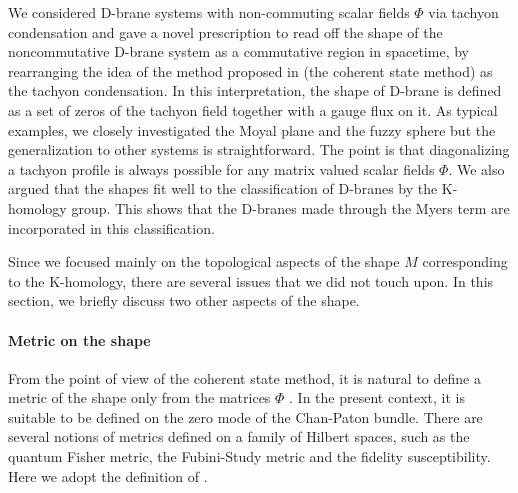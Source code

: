 \documentclass[12pt]{article}
\numberwithin{equation}{section}
\def\real{\mathbb{R}}
\begin{document}
We considered D-brane systems with non-commuting scalar fields $\Phi$ via tachyon condensation and gave a novel prescription to read off the shape of the noncommutative D-brane system {as a commutative region in spacetime,} 
by {rearranging} the idea of the method proposed in \cite{Berenstein2012,Ishiki2015,Schneiderbauer2016}
(the coherent state method) {as the} tachyon condensation. 
In this interpretation, the shape of D-brane is defined as a set of zeros of the tachyon field
{together with a gauge flux on it}. %
As typical examples, we closely investigated the Moyal plane and the fuzzy sphere but the generalization to other systems is straightforward.
The point is that diagonalizing a tachyon profile is always
possible for any matrix valued scalar fields $\Phi$.
We also %
{argued that the shapes} fit well to the classification of D-branes by the K-homology group.
{This shows that the D-branes made through the Myers term are incorporated in this classification.}

{Since we focused mainly on the topological aspects of the shape $M$ corresponding to the K-homology, there are several issues that we did not touch upon.
In this section, we briefly discuss two other aspects of the shape.}


\paragraph{{Metric on the shape}}


From the point of view of the coherent state method, it is natural to define a metric 
{of the shape} only from the matrices $\Phi$ {\cite{Ishiki2015,Ishiki2016}. 
In the present context, it is suitable to be defined on the zero mode of the Chan-Paton bundle.}  
There are several notions of metrics defined on a family of Hilbert spaces, such as the quantum Fisher metric, the Fubini-Study metric and the fidelity susceptibility.
Here we adopt the definition of \cite{Provost1980,Zanardi2007}. 
\end{document}
